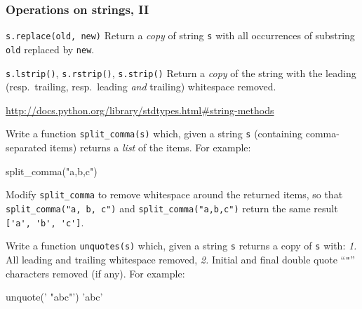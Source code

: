 \documentclass[english,serif,mathserif,xcolor=pdftex,dvipsnames,table]{beamer}
\begin{document}
\begin{frame}[fragile]
  \frametitle{Operations on strings, II}
  \begin{describe}{\lstinline|s.replace(old, new)|}
    Return a \emph{copy} of string \texttt{s} with all occurrences of
    substring \texttt{old} replaced by \texttt{new}.
  \end{describe}

  \begin{describe}{%
      \lstinline|s.lstrip()|,
      \lstinline|s.rstrip()|,
      \lstinline|s.strip()|}
    Return a \emph{copy} of the string with the leading (resp.\ trailing,
    resp.\ leading \emph{and} trailing) whitespace removed.
  \end{describe}

  \begin{references}
    \url{http://docs.python.org/library/stdtypes.html#string-methods}
  \end{references}
\end{frame}


\begin{frame}[fragile]
  \small

  \begin{exercise*}[5.A]
    Write a function \lstinline|split_comma(s)| which, given a string
    \lstinline|s| (containing comma-separated items) returns a
    \emph{list} of the items.  For example:
\begin{semiverbatim}
\In split_comma("a,b,c")
\Out ['a', 'b', 'c']
\end{semiverbatim}
  \end{exercise*}

  \begin{exercise*}[5.B]
    Modify \lstinline|split_comma| to remove whitespace around the
    returned items, so that \lstinline|split_comma("a, b, c")| and
    \lstinline|split_comma("a,b,c")| return the same result
    \lstinline|['a', 'b', 'c']|.
  \end{exercise*}

  \+
  \begin{exercise*}[5.C]
    Write a function \lstinline|unquotes(s)| which, given a string \lstinline|s| returns a copy of \lstinline|s| with:
    {\color{gray}\em 1.} All leading and trailing whitespace removed,
    {\color{gray}\em 2.} Initial and final double quote ``\lstinline|"|'' characters removed (if any).
    For example:
\begin{semiverbatim}
\In unquote(' "abc"')
\Out 'abc'
\end{semiverbatim}
  \end{exercise*}
\end{frame}
\end{document}
